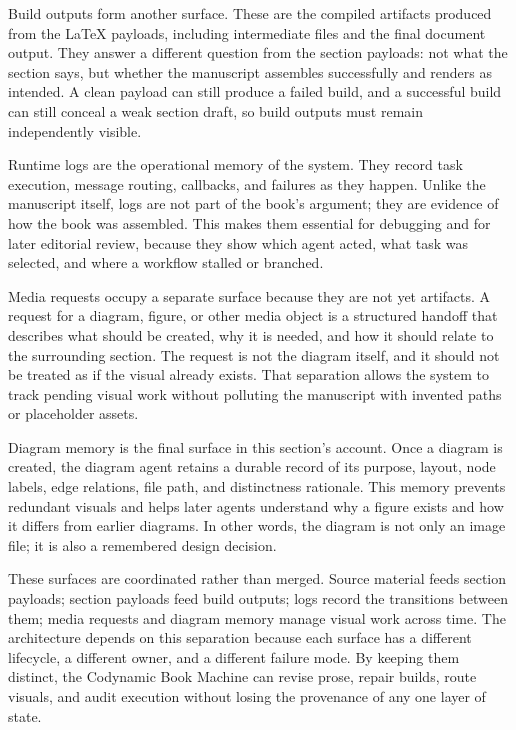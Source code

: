 \documentclass[11pt]{article}
\begin{document}
Build outputs form another surface. These are the compiled artifacts produced from the \LaTeX{} payloads, including intermediate files and the final document output. They answer a different question from the section payloads: not what the section says, but whether the manuscript assembles successfully and renders as intended. A clean payload can still produce a failed build, and a successful build can still conceal a weak section draft, so build outputs must remain independently visible.

Runtime logs are the operational memory of the system. They record task execution, message routing, callbacks, and failures as they happen. Unlike the manuscript itself, logs are not part of the book's argument; they are evidence of how the book was assembled. This makes them essential for debugging and for later editorial review, because they show which agent acted, what task was selected, and where a workflow stalled or branched.

Media requests occupy a separate surface because they are not yet artifacts. A request for a diagram, figure, or other media object is a structured handoff that describes what should be created, why it is needed, and how it should relate to the surrounding section. The request is not the diagram itself, and it should not be treated as if the visual already exists. That separation allows the system to track pending visual work without polluting the manuscript with invented paths or placeholder assets.

Diagram memory is the final surface in this section's account. Once a diagram is created, the diagram agent retains a durable record of its purpose, layout, node labels, edge relations, file path, and distinctness rationale. This memory prevents redundant visuals and helps later agents understand why a figure exists and how it differs from earlier diagrams. In other words, the diagram is not only an image file; it is also a remembered design decision.

These surfaces are coordinated rather than merged. Source material feeds section payloads; section payloads feed build outputs; logs record the transitions between them; media requests and diagram memory manage visual work across time. The architecture depends on this separation because each surface has a different lifecycle, a different owner, and a different failure mode. By keeping them distinct, the Codynamic Book Machine can revise prose, repair builds, route visuals, and audit execution without losing the provenance of any one layer of state.
\end{document}
